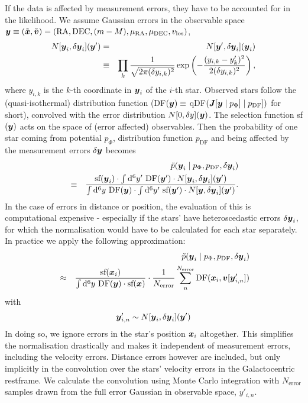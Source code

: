 
If the data is affected by measurement errors, they have to be accounted for in the likelihood. We assume Gaussian errors in the observable space $\boldsymbol{y} \equiv (\tilde{\boldsymbol{x}},\tilde{\boldsymbol{v}})=(\text{RA},\text{DEC},(m-M),\mu_\text{RA},\mu_\text{DEC},v_\text{los})$,
\begin{eqnarray*}
N[\boldsymbol{y}_i,\delta \boldsymbol{y}_i](\boldsymbol{y}') &=& N[\boldsymbol{y}',\delta \boldsymbol{y}_i](\boldsymbol{y}_i)\\ 
&\equiv&  \prod_k \frac{1}{\sqrt{2\pi(\delta {y}_{i,k})^2}} \exp\left( -\frac{(y_{i,k}-y_k')^2}{2(\delta y_{i,k})^2}\right),
\end{eqnarray*}
where $y_{i,k}$ is the $k$-th coordinate in $\boldsymbol{y}_i$ of the $i$-th star. Observed stars follow the (quasi-isothermal) distribution function (DF$(\boldsymbol{y}) \equiv$ qDF$(\boldsymbol{J}[\boldsymbol{y} \mid p_\Phi] \mid p_\text{DF}])$ for short), convolved with the error distribution $N[0,\delta y](\boldsymbol{y})$. The selection function sf$(\boldsymbol{y})$ acts on the space of (error affected) observables. 
Then the probability of one star coming from potential $p_\Phi$, distribution function $p_\text{DF}$ and being affected by the measurement errors $\delta \boldsymbol{y}$ becomes
\begin{eqnarray*}
&&\tilde{p}(\boldsymbol{y}_i \mid p_\Phi,p_\text{DF},\delta \boldsymbol{y}_i)\\
& \equiv& \frac{\text{sf}(\boldsymbol{y}_i) \cdot \int \mathop{}\!\mathrm{d^6} y' \  \text{DF}(\boldsymbol{y}') \cdot N[\boldsymbol{y}_i,\delta \boldsymbol{y}_i](\boldsymbol{y}')}{\int \mathop{}\!\mathrm{d^6}y  \  \text{DF}(\boldsymbol{y})  \cdot  \int \mathop{}\!\mathrm{d^6} y' \  \text{sf}(\boldsymbol{y}')  \cdot N[\boldsymbol{y},\delta \boldsymbol{y}_i](\boldsymbol{y}')}.
\end{eqnarray*}
In the case of errors in distance or position, the evaluation of this is computational expensive - especially if the stars' have heteroscedastic errors $\delta \boldsymbol{y}_i$, for which the normalisation would have to be calculated for each star separately. In practice we apply the following approximation:
\begin{eqnarray}
&&\tilde{p}(\boldsymbol{y}_i \mid p_\Phi,p_\text{DF},\delta \boldsymbol{y}_i) \nonumber\\
&\approx& \frac{ \text{sf}(\boldsymbol{x}_i)}{\int \mathop{}\!\mathrm{d^6}y  \  \text{DF}(\boldsymbol{y})  \cdot   \text{sf}(\boldsymbol{x})} \cdot \frac{1}{N_\text{error}} \sum_n^{N_\text{error}}  \text{DF}(\boldsymbol{x}_i,\boldsymbol{v}[\boldsymbol{y}'_{i,n}]) \label{eq:errorconv}
\end{eqnarray}
with
\begin{eqnarray}
\boldsymbol{y}'_{i,n} \sim N[\boldsymbol{y}_i,\delta \boldsymbol{y}_i](\boldsymbol{y}')\nonumber
\end{eqnarray}
In doing so, we ignore errors in the star's position $\boldsymbol{x}_i$ altogether. This simplifies the normalisation drastically and makes it independent of measurement errors, including the velocity errors. Distance errors however are included, but only implicitly in the convolution over the stars' velocity errors in the Galactocentric restframe. We calculate the convolution using Monte Carlo integration with $N_\text{error}$ samples drawn from the full error Gaussian in observable space, $y'_{i,n}$. 
